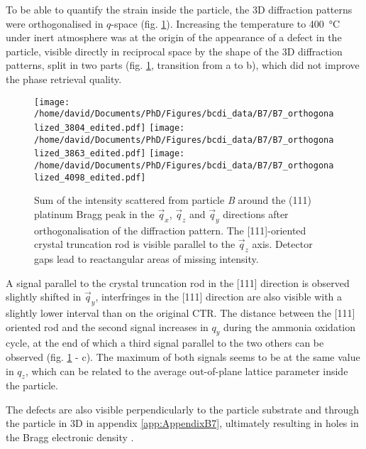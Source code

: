 To be able to quantify the strain inside the particle, the 3D diffraction patterns were orthogonalised in $q$-space (fig. \ref{fig:B7Ortho}).
Increasing the temperature to \qty{400}{\degreeCelsius} under inert atmosphere was at the origin of the appearance of a defect in the particle, visible directly in reciprocal space by the shape of the 3D diffraction patterns, split in two parts (fig. \ref{fig:B7Ortho}, transition from a to b), which did not improve the phase retrieval quality.

\begin{figure}[!htb]
    \centering
    \texttt{[image: /home/david/Documents/PhD/Figures/bcdi\_data/B7/B7\_orthogonalized\_3804\_edited.pdf]}
    \texttt{[image: /home/david/Documents/PhD/Figures/bcdi\_data/B7/B7\_orthogonalized\_3863\_edited.pdf]}
    \texttt{[image: /home/david/Documents/PhD/Figures/bcdi\_data/B7/B7\_orthogonalized\_4098\_edited.pdf]}
    \caption{
        Sum of the intensity scattered from particle \textit{B} around the (111) platinum Bragg peak in the $\vec{q}_x$, $\vec{q}_z$ and $\vec{q}_y$ directions after orthogonalisation of the diffraction pattern.
        The [111]-oriented crystal truncation rod is visible parallel to the $\vec{q}_z$ axis.
        Detector gaps lead to reactangular areas of missing intensity.
    }
    \label{fig:B7Ortho}
\end{figure}

A signal parallel to the crystal truncation rod in the [111] direction is observed slightly shifted in $\vec{q}_y$, interfringes in the [111] direction are also visible with a slightly lower interval than on the original CTR.
The distance between the [111] oriented rod and the second signal increases in $q_y$ during the ammonia oxidation cycle, at the end of which a third signal parallel to the two others can be observed (fig. \ref{fig:B7Ortho} - c).
The maximum of both signals seems to be at the same value in $q_z$, which can be related to the average out-of-plane lattice parameter inside the particle.

The defects are also visible perpendicularly to the particle substrate and through the particle in 3D in appendix \ref{app:AppendixB7}, ultimately resulting in holes in the Bragg electronic density \parencite{Clark2015, Dupraz2015}.

